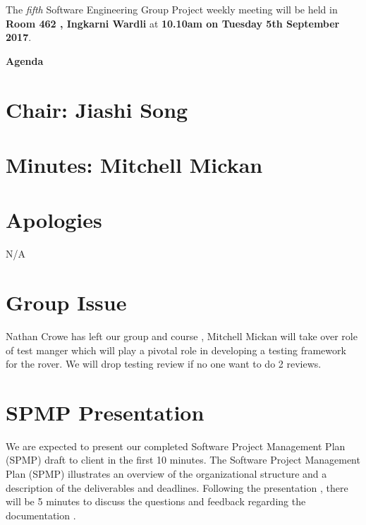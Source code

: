 \documentclass[11pt, a4paper]{article}
\newcommand{\meetingno}{ fifth }
\newcommand{\meetinglocation}{ Room 462 , Ingkarni Wardli} %
\newcommand{\meetingdatetime}{ 10.10am on Tuesday 5th September 2017} %
\newcommand{\meetingchair}{ Jiashi Song } %
\newcommand{\meetingminutes}{ Mitchell Mickan }
\begin{document}
  \noindent The {\em \meetingno} Software Engineering Group Project weekly meeting will be held in {\bf \meetinglocation } at {\bf \meetingdatetime }.

  \vspace*{15pt}

  \begin{center}
  \huge \bf Agenda
  \end{center}

  \section*{Chair: \meetingchair }
  \section*{Minutes: \meetingminutes }
  

  \vspace*{10pt}

  \section{Apologies}
  N/A %
 \section{Group Issue}
Nathan Crowe has left our group and course , Mitchell Mickan will take over role of test manger which will play a pivotal role in developing a testing framework for the rover. We will drop testing review if no one want to do 2 reviews.
  \section{SPMP Presentation}
We are expected to present our completed Software Project Management Plan (SPMP) draft to client in the first 10 minutes. The Software Project Management Plan (SPMP) illustrates an overview of the organizational structure and a description of the deliverables and deadlines. Following the presentation , there will be 5 minutes to discuss the questions and feedback regarding the documentation  .
\end{document}
